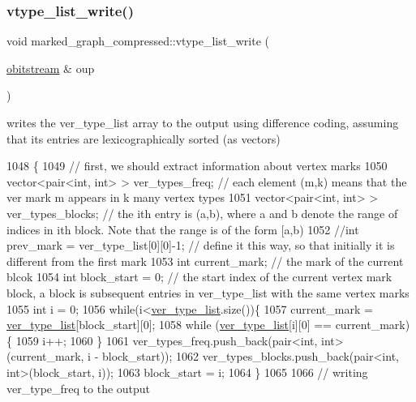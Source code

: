 \subsubsection{\texorpdfstring{vtype\+\_\+list\+\_\+write()}{vtype\_list\_write()}}
{\footnotesize\ttfamily void marked\+\_\+graph\+\_\+compressed\+::vtype\+\_\+list\+\_\+write (\begin{DoxyParamCaption}\item[{\hyperlink{classobitstream}{obitstream} \&}]{oup }\end{DoxyParamCaption})}



writes the ver\+\_\+type\+\_\+list array to the output using difference coding, assuming that its entries are lexicographically sorted (as vectors) 


\begin{DoxyCode}
1048                                                              \{
1049   \textcolor{comment}{// first, we should extract information about vertex marks}
1050   vector<pair<int, int> > ver\_types\_freq; \textcolor{comment}{// each element (m,k) means that the ver mark m appears in k many
       vertex types}
1051   vector<pair<int, int> > ver\_types\_blocks; \textcolor{comment}{// the ith entry is (a,b), where a and b denote the range of
       indices in ith block. Note that the range is of the form [a,b)}
1052   \textcolor{comment}{//int prev\_mark = ver\_type\_list[0][0]-1; // define it this way, so that initially it is different from
       the first mark}
1053   \textcolor{keywordtype}{int} current\_mark; \textcolor{comment}{// the mark of the current blcok}
1054   \textcolor{keywordtype}{int} block\_start = 0; \textcolor{comment}{// the start index of the current vertex mark block, a block is subsequent entries
       in ver\_type\_list with the same vertex marks}
1055   \textcolor{keywordtype}{int} i = 0;
1056   \textcolor{keywordflow}{while}(i<\hyperlink{classmarked__graph__compressed_af2e3e55223d436628a02758dfae88493}{ver\_type\_list}.size())\{
1057     current\_mark = \hyperlink{classmarked__graph__compressed_af2e3e55223d436628a02758dfae88493}{ver\_type\_list}[block\_start][0];
1058     \textcolor{keywordflow}{while} (\hyperlink{classmarked__graph__compressed_af2e3e55223d436628a02758dfae88493}{ver\_type\_list}[i][0] == current\_mark)\{
1059       i++;
1060     \}
1061     ver\_types\_freq.push\_back(pair<int, int>(current\_mark, i - block\_start));
1062     ver\_types\_blocks.push\_back(pair<int, int>(block\_start, i));
1063     block\_start = i;
1064   \}
1065 
1066   \textcolor{comment}{// writing ver\_type\_freq to the output}

\end{DoxyCode}
